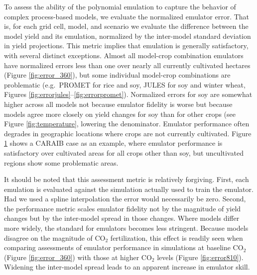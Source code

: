 \documentclass[preprint, 5p, times, twocolumn]{elsarticle}
\begin{document}
{\begin{figure}[!p]
   \label{fig:error}
\end{figure}

To assess the ability of the polynomial emulation to capture the behavior of complex process-based models, we evaluate the normalized emulator error. That is, for each grid cell, model, and scenario we evaluate the difference between the model yield and its emulation, normalized by the inter-model standard deviation in yield projections. This metric implies that emulation is generally satisfactory, with several distinct exceptions. Almost all model-crop combination emulators have normalized errors less than one over nearly all currently cultivated hectares (Figure \ref{fig:error_360}), but some individual model-crop combinations are problematic (e.g.\ PROMET for rice and soy, JULES for soy and winter wheat, Figures \ref{fig:errorjules}--\ref{fig:errorpromet}). Normalized errors for soy are somewhat higher across all models not because emulator fidelity is worse but because models agree more closely on yield changes for soy than for other crops (see Figure \ref{fig:temperature}, lowering the denominator. Emulator performance often degrades in geographic locations where crops are not currently cultivated. Figure \ref{fig:error} shows a CARAIB case as an example, where emulator performance is satisfactory over cultivated areas for all crops other than soy, but uncultivated regions show some problematic areas. 

It should be noted that this assessment metric is relatively forgiving. First, each emulation is evaluated against the simulation actually used to train the emulator. Had we used a spline interpolation the error would necessarily be zero. Second, the performance metric scales emulator fidelity not by the magnitude of yield changes but by the inter-model spread in those changes. Where models differ more widely, the standard for emulators becomes less stringent. Because models disagree on the magnitude of CO$_2$ fertilization, this effect is readily seen when comparing assessments of emulator performance in simulations at  baseline CO$_2$ (Figure \ref{fig:error_360}) with those at higher CO$_2$ levels (Figure \ref{fig:error810}). Widening the inter-model spread leads to an apparent increase in emulator skill.

}
\end{document}
